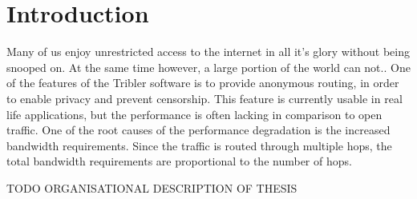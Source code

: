 \chapter{Introduction}
\label{chp:introduction}
Many of us enjoy unrestricted access to the internet in all it's glory without being snooped on. At the same time however, a large portion of the world can not.\cite{https://en.wikipedia.org/wiki/Internet_censorship_and_surveillance_by_country}. One of the features of the Tribler software is to provide anonymous routing, in order to enable privacy and prevent censorship. This feature is currently usable in real life applications, but the performance is often lacking in comparison to open traffic. One of the root causes of the performance degradation is the increased bandwidth requirements. Since the traffic is routed through multiple hops, the total bandwidth requirements are proportional to the number of hops.

\vspace{1\baselineskip}

\noindent
TODO ORGANISATIONAL DESCRIPTION OF THESIS


